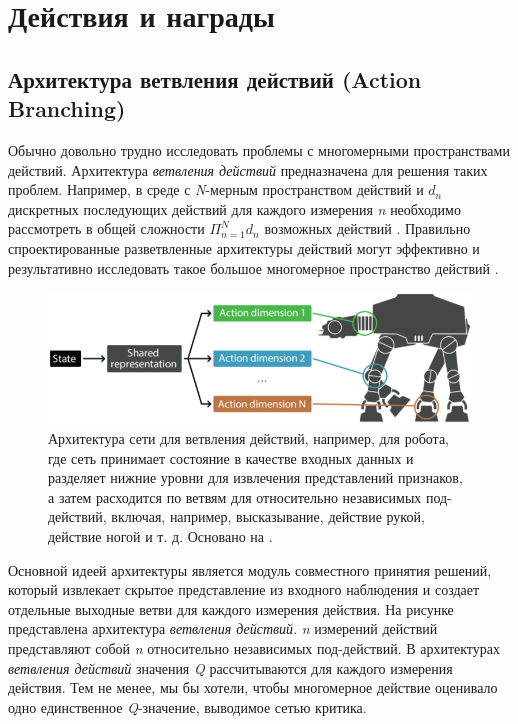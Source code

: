 \section{Действия и награды} \label{ch2:act-rew} %

\subsection{Архитектура ветвления действий (Action Branching)}

Обычно довольно трудно исследовать проблемы с многомерными пространствами действий. Архитектура \textit{ветвления действий} предназначена для решения таких проблем. Например, в среде с \textit{N}-мерным пространством действий и $d_n$ дискретных последующих действий для каждого измерения \textit{n} необходимо рассмотреть в общей сложности $\Pi^N_{n=1} d_n$ возможных действий \cite{tavakoli2017action}. Правильно спроектированные разветвленные архитектуры действий могут эффективно и результативно исследовать такое большое многомерное пространство действий \cite{tavakoli2017action}.

\begin{figure}[ht!]
    \center
    \includegraphics [scale=0.80] {my_folder/images/ch2/action-branching.png}
    \caption{Архитектура сети для ветвления действий, например, для робота, где сеть принимает состояние в качестве входных данных и разделяет нижние уровни для извлечения представлений признаков, а затем расходится по ветвям для относительно независимых под-действий, включая, например, высказывание, действие рукой, действие ногой и т. д. Основано на \cite{tavakoli2017action}.}
    \label{fig:ch2-action-branching}
\end{figure}

Основной идеей архитектуры является модуль совместного принятия решений, который извлекает скрытое представление из входного наблюдения и создает отдельные выходные ветви для каждого измерения действия. На рисунке  представлена архитектура \textit{ветвления действий}. \textit{n} измерений действий представляют собой \textit{n} относительно независимых под-действий.
В архитектурах \textit{ветвления действий} значения \textit{Q} рассчитываются для каждого измерения действия. Тем не менее, мы бы хотели, чтобы многомерное действие оценивало одно единственное \textit{Q}-значение, выводимое сетью критика.

